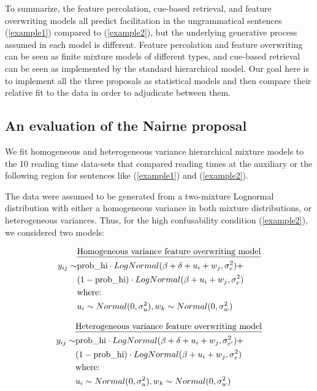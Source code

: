 \documentclass{cambridge7A}\usepackage[]{graphicx}\usepackage[]{color}
\begin{document}
To summarize, the feature percolation, cue-based retrieval, and 
feature overwriting models all predict facilitation in the ungrammatical sentences (\ref{example1}) compared to (\ref{example2}), but the underlying generative process assumed in each model is different. Feature percolation and feature overwriting can be seen as finite mixture models of different types, and cue-based retrieval can be seen as implemented by the standard hierarchical model.
Our goal here is to implement all the three proposals as statistical models and then compare their relative fit to the data in order to adjudicate between them.


\subsection{An evaluation of the Nairne proposal}

We fit homogeneous and heterogeneous variance hierarchical mixture models to the 10 reading time data-sets that compared reading times at the auxiliary or the following region for sentences like (\ref{example1}) and (\ref{example2}). 

The data were assumed to be generated from a two-mixture Lognormal distribution with either a homogeneous variance in both mixture distributions, or heterogeneous variances. 
Thus, for the high confusability condition (\ref{example2}), we considered two models:

\begin{equation}
\begin{split}
       ~&\hbox{\underline{Homogeneous variance feature overwriting model}}\\
y_{ij} \sim& \hbox{prob\_hi} \cdot LogNormal(\beta+\delta+u_i+w_j,\sigma_{e}^2)+\\
           ~& (1-\hbox{prob\_hi}) \cdot LogNormal(\beta+u_i+w_j,\sigma_e^2)\\
           ~& \hbox{where: }\\
           ~& u_i \sim Normal(0,\sigma_u^2), w_k \sim Normal(0,\sigma_w^2)\\ 
\end{split}
\end{equation}


\begin{equation}
\begin{split}
       ~&\hbox{\underline{Heterogeneous variance feature overwriting model}}\\
y_{ij}
\sim& \hbox{prob\_hi} \cdot LogNormal(\beta+\delta+u_i+w_j,\sigma_{e'}^2)+\\
           ~& (1-\hbox{prob\_hi}) \cdot LogNormal(\beta+u_i+w_j,\sigma_e^2)\\
           ~& \hbox{where: }\\
           ~& u_i \sim Normal(0,\sigma_u^2), w_k \sim Normal(0,\sigma_w^2)\\ 
\end{split}
\end{equation}
\end{document}
